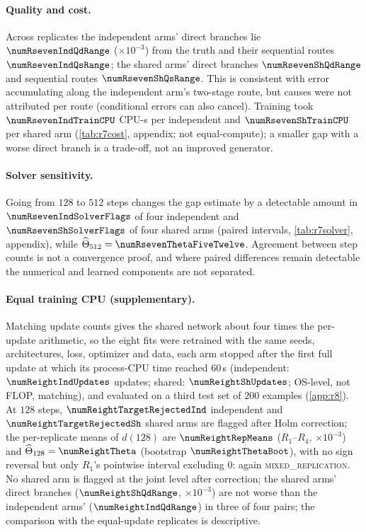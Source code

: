 \documentclass{article}
\theoremstyle{plain}
\theoremstyle{definition}
\theoremstyle{remark}
\begin{document}
\paragraph{Quality and cost.}
Across replicates the independent arms' direct branches lie $\numRsevenIndQdRange$ ($\times10^{-3}$) from the truth and their sequential routes $\numRsevenIndQsRange$; the shared arms' direct branches $\numRsevenShQdRange$ and sequential routes $\numRsevenShQsRange$.
This is consistent with error accumulating along the independent arm's two-stage route, but causes were not attributed per route (conditional errors can also cancel).
Training took $\numRsevenIndTrainCPU$ CPU-s per independent and $\numRsevenShTrainCPU$ per shared arm (\cref{tab:r7cost}, appendix; not equal-compute); a smaller gap with a worse direct branch is a trade-off, not an improved generator.

\paragraph{Solver sensitivity.}
Going from $128$ to $512$ steps changes the gap estimate by a detectable amount in $\numRsevenIndSolverFlags$ of four independent and $\numRsevenShSolverFlags$ of four shared arms (paired intervals, \cref{tab:r7solver}, appendix), while $\widehat\Theta_{512}=\numRsevenThetaFiveTwelve$.
Agreement between step counts is not a convergence proof, and where paired differences remain detectable the numerical and learned components are not separated.

\paragraph{Equal training CPU (supplementary).}
Matching update counts gives the shared network about four times the per-update arithmetic, so the eight fits were retrained with the same seeds, architectures, loss, optimizer and data, each arm stopped after the first full update at which its process-CPU time reached $60$\,s (independent: $\numReightIndUpdates$ updates; shared: $\numReightShUpdates$; OS-level, not FLOP, matching), and evaluated on a third test set of $200$ examples (\cref{app:r8}).
At $128$ steps, $\numReightTargetRejectedInd$ independent and $\numReightTargetRejectedSh$ shared arms are flagged after Holm correction; the per-replicate means of $d(128)$ are $\numReightRepMeans$ ($R_1$--$R_4$, $\times10^{-3}$) and $\widehat\Theta_{128}=\numReightTheta$ (bootstrap $\numReightThetaBoot$), with no sign reversal but only $R_1$'s pointwise interval excluding $0$: again \textsc{mixed\_replication}.
No shared arm is flagged at the joint level after correction; the shared arms' direct branches ($\numReightShQdRange$, $\times10^{-3}$) are not worse than the independent arms' ($\numReightIndQdRange$) in three of four pairs; the comparison with the equal-update replicates is descriptive.
\end{document}
